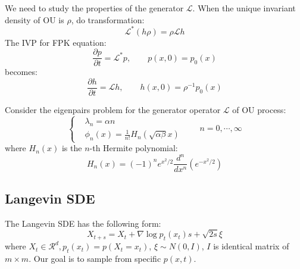 We need to study the properties of the generator $\mathcal{L}$. When the unique invariant density of OU is $\rho$, do transformation:
\begin{equation}
    \mathcal{L}^*(h\rho)=\rho \mathcal{L}h
\end{equation}
The IVP for FPK equation:
\begin{equation}
    \frac{\partial p}{\partial t}=\mathcal{L}^*p,\qquad p(x,0)=p_0(x)
\end{equation}
becomes:
\begin{equation}
    \frac{\partial h}{\partial t}=\mathcal{L}h,\qquad h(x,0)=\rho^{-1}p_0(x)
\end{equation}

\begin{theorem}
    Consider the eigenpairs problem for the generator operator $\mathcal{L}$ of OU process:
    \begin{equation}\left\{
        \begin{aligned}
            &\lambda_n = \alpha n\\
            &\phi_n(x) = \frac{1}{n!}H_n(\sqrt{\alpha \beta}x)
        \end{aligned}\right.\qquad n=0, \cdots, \infty \label{eigenpairs}
    \end{equation}
    where $H_n(x)$ is the $n$-th Hermite polynomial:
    \begin{equation}
        H_n(x) = (-1)^n e^{x^2/2}\frac{d^n}{dx^n}(e^{-x^2/2})
    \end{equation}
\end{theorem}


\subsection{Langevin SDE}
The Langevin SDE has the following form:
\begin{equation}
    X_{t + s} = X_t + \nabla \log p_t(x_t)s + \sqrt{2s}\xi
\end{equation}
where $X_t\in \mathcal{R}^d, p_t(x_t)=p(X_t=x_t)$, $\xi\sim N(0, I)$, $I$ is identical matrix of $m \times m$. Our goal is to sample from specific $p(x, t)$.

